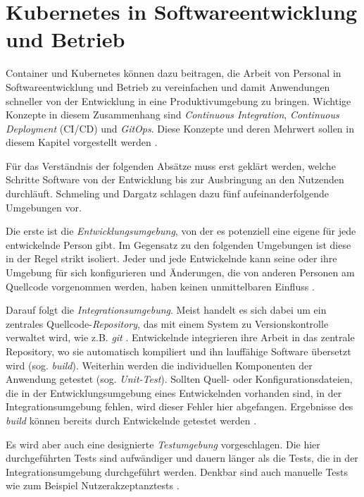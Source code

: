 \documentclass[11pt,a4paper]{article}
\begin{document}
\section{Kubernetes in Softwareentwicklung und Betrieb}
Container und Kubernetes können dazu beitragen, die Arbeit von Personal in Softwareentwicklung und
Betrieb zu vereinfachen und damit Anwendungen schneller von der Entwicklung
in eine Produktivumgebung zu bringen.
Wichtige Konzepte in diesem Zusammenhang sind
\emph{Continuous Integration}, \emph{Continuous Deployment} (CI/CD)
und \emph{GitOps}. Diese Konzepte und deren Mehrwert sollen in diesem Kapitel vorgestellt werden \cite{domingus2022cloud}.

Für das Verständnis der folgenden Absätze muss erst geklärt werden,
welche Schritte Software von der Entwicklung bis zur Ausbringung an den
Nutzenden durchläuft.
Schmeling und Dargatz \cite{Schmeling_Dargatz_2022} schlagen dazu
fünf aufeinanderfolgende Umgebungen vor.

Die erste ist die \emph{Entwicklungsumgebung}, von der es potenziell
eine eigene für jede entwickelnde Person gibt. Im Gegensatz zu den folgenden
Umgebungen ist diese in der Regel strikt isoliert. Jeder und jede Entwickelnde
kann seine oder ihre Umgebung für sich konfigurieren und Änderungen, die von anderen
Personen am Quellcode vorgenommen werden, haben keinen unmittelbaren Einfluss \cite{Schmeling_Dargatz_2022}.

Darauf folgt die \emph{Integrationsumgebung}. Meist handelt es sich dabei
um ein zentrales Quellcode-\emph{Repository}, das mit einem System zu Versionskontrolle
verwaltet wird, wie z.B. \emph{git} \cite{chacon2014pro}.
Entwickelnde integrieren ihre Arbeit in das zentrale Repository, wo sie
automatisch kompiliert und ihn lauffähige Software übersetzt wird (sog. \emph{build}).
Weiterhin werden die individuellen Komponenten der Anwendung getestet (sog. \emph{Unit-Test}).
Sollten Quell- oder Konfigurationsdateien, die in der Entwicklungsumgebung
eines Entwickelnden vorhanden sind, in der Integrationsumgebung fehlen,
wird dieser Fehler hier abgefangen.
Ergebnisse des \emph{build} können bereits durch Entwickelnde getestet werden \cite{Schmeling_Dargatz_2022}.

Es wird aber auch eine designierte \emph{Testumgebung} vorgeschlagen.
Die hier durchgeführten Tests sind aufwändiger und dauern länger als
die Tests, die in der Integrationsumgebung durchgeführt werden.
Denkbar sind auch manuelle Tests wie zum Beispiel Nutzerakzeptanztests \cite{Schmeling_Dargatz_2022}.
\end{document}
